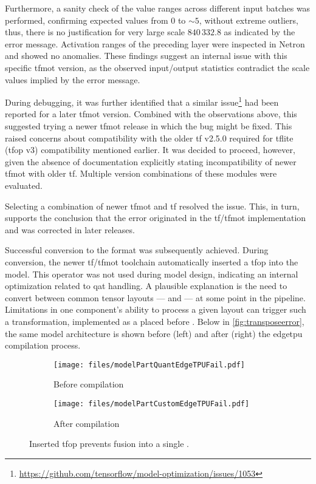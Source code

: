 {Furthermore, a sanity check of the value ranges across different input batches was performed, confirming expected values from \(0\) to \(\sim 5\),
without extreme outliers, thus, there is no justification for very large scale \(840{\,}332.8\) as indicated by the error message.
Activation ranges of the preceding  layer were inspected in Netron and showed no anomalies.
These findings suggest an internal issue with this specific \gls{tfmot} version, as the observed input/output statistics contradict the scale values implied by the error message.

During debugging, it was further identified that a similar issue\footnote{\url{https://github.com/tensorflow/model-optimization/issues/1053}} had been reported for a later \gls{tfmot} version.
Combined with the observations above, this suggested trying a newer \gls{tfmot} release in which the bug might be fixed.
This raised concerns about compatibility with the older \gls{tf} v2.5.0 required for \gls{tflite} (\gls{tfop} v3) compatibility mentioned earlier.
It was decided to proceed, however, given the absence of documentation explicitly stating incompatibility of newer \gls{tfmot} with older \gls{tf}.
Multiple version combinations of these modules were evaluated.

Selecting a combination of newer \gls{tfmot} and \gls{tf} resolved the issue.
This, in turn, supports the conclusion that the error originated in the \gls{tf}/\gls{tfmot} implementation and was corrected in later releases.

Successful conversion to the  format was subsequently achieved.
During conversion, the newer \gls{tf}/\gls{tfmot} toolchain automatically inserted a  \gls{tfop} into the model.
This operator was not used during model design, indicating an internal optimization related to \gls{qat} handling.
A plausible explanation is the need to convert between common tensor layouts ---  and  --- at some point in the pipeline.
Limitations in one component's ability to process a given layout can trigger such a transformation, implemented as a  placed before .
Below in \autoref{fig:transposeerror}, the same model architecture is shown before (left) and after (right) the \gls{edgetpu} compilation process.

\begin{figure}[H]
  \centering
  \begin{subfigure}[t]{0.48\textwidth}
    \centering
    \texttt{[image: files/modelPartQuantEdgeTPUFail.pdf]}
    \caption{Before compilation}
  \end{subfigure}
  \hfill
  \begin{subfigure}[t]{0.48\textwidth}
    \centering
    \texttt{[image: files/modelPartCustomEdgeTPUFail.pdf]}
    \caption{After compilation}
  \end{subfigure}
  \caption{Inserted  \gls{tfop} prevents fusion into a single .}
  \label{fig:transposeerror}
\end{figure}

}
